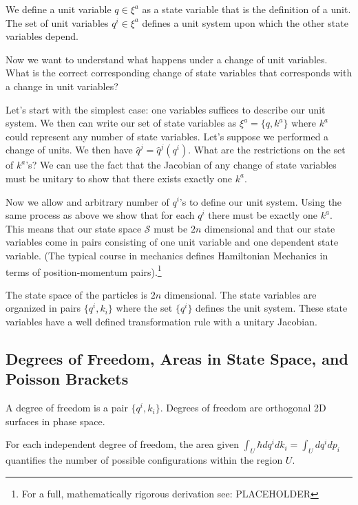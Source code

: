 \documentclass{article}
\begin{document}
\begin{defn}
	We define a unit variable $q \in \xi^a$ as a state variable that is the definition of a unit. The set of unit variables $q^i \in \xi^a$ defines a unit system upon which the other state variables depend.
\end{defn}

	Now we want to understand what happens under a change of unit variables. What is the correct corresponding change of state variables that corresponds with a change in unit variables? 
	
	Let's start with the simplest case: one variables suffices to describe our unit system. We then can write our set of state variables as $\xi^a = \{q,k^a\}$ where $k^a$ could represent any number of state variables. Let's suppose we performed a change of units. We then have $\hat{q}^j = \hat{q}^j(q^i)$. What are the restrictions on the set of $k^a$'s? We can use the fact that the Jacobian of any change of state variables must be unitary to show that there exists exactly one $k^a$. 
	
	Now we allow and arbitrary number of $q^i$'s to define our unit system. Using the same process as above we show that for each $q^i$ there must be exactly one $k^a$. This means that our state space $\mathcal{S}$ must be $2n$ dimensional and that our state variables come in pairs consisting of one unit variable and one dependent state variable. (The typical course in mechanics defines Hamiltonian Mechanics in terms of position-momentum pairs).\footnote{For a full, mathematically rigorous derivation see: PLACEHOLDER}

\begin{prop}
	The state space of the particles is $2n$ dimensional. The state variables are organized in pairs $\{q^i, k_i\}$ where the set $\{q^i\}$ defines the unit system. These state variables have a well defined transformation rule with a unitary Jacobian.
\end{prop}

\subsection{Degrees of Freedom, Areas in State Space, and Poisson Brackets}

\begin{defn}
	A degree of freedom is a pair $\{q^i,k_i\}$. Degrees of freedom are orthogonal 2D surfaces in phase space.
\end{defn}
	
\begin{prop}
	For each independent degree of freedom, the area given $\int_U \hbar dq^i dk_i = \int_U dq^i dp_i$ quantifies the number of possible configurations within the region $U$.
\end{prop}
\end{document}
